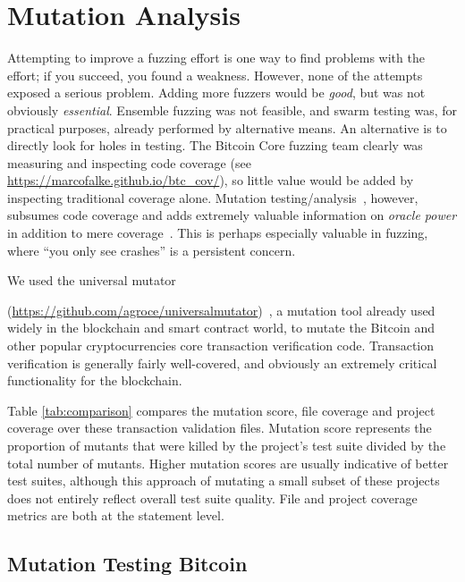 \section{Mutation Analysis}

Attempting to improve a fuzzing effort is one way to find problems
with the effort; if you succeed, you found a weakness.  However, none
of the attempts exposed a serious problem.  Adding more fuzzers would
be \emph{good}, but was not obviously \emph{essential}.  Ensemble
fuzzing was not feasible, and swarm testing was, for practical
purposes, already performed by alternative means.  An alternative is
to directly look for holes in testing.  The Bitcoin Core fuzzing team
clearly was measuring and inspecting code coverage (see \url{https://marcofalke.github.io/btc_cov/}), so little value
would be added by inspecting traditional coverage alone.  Mutation
testing/analysis~\cite{MutationSurvey}, however, subsumes code coverage and adds extremely
valuable information on \emph{oracle power} in addition to mere
coverage~\cite{Discontents}.  This is perhaps especially valuable in fuzzing, where ``you
only see crashes'' is a persistent concern.

We used the universal mutator 

\noindent(\url{https://github.com/agroce/universalmutator})~\cite{regexpMut}, 
a mutation tool already used widely in the blockchain and smart contract
world, to mutate the Bitcoin and other popular cryptocurrencies core transaction verification code. 
Transaction verification is generally fairly well-covered, and obviously an extremely critical functionality for the
blockchain. 

Table \ref{tab:comparison} compares the mutation score, file coverage and project coverage over these transaction validation files. Mutation score represents the proportion
of mutants that were killed by the project's test suite divided by the total number of mutants. Higher mutation scores are usually indicative of better test suites, although this approach
of mutating a small subset of these projects does not entirely reflect overall test suite quality. File and project coverage metrics are both at the statement level.

\subsection{Mutation Testing Bitcoin}

